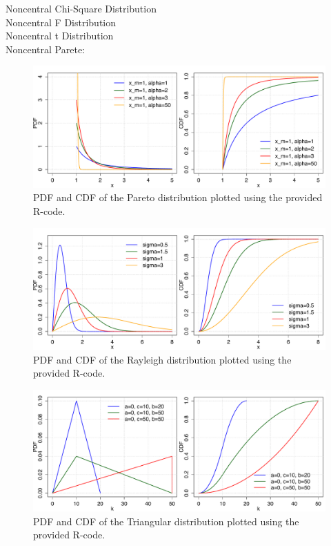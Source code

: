 Noncentral Chi-Square Distribution\\
Noncentral F Distribution\\
Noncentral t Distribution\\
Noncentral Parete:\\

\begin{figure}[htb!]
\centering
  \includegraphics[width=140mm]{pics/Pareto_pdf_cdf.pdf}
 \caption{PDF and CDF of the Pareto distribution plotted using the provided R-code.}
 \label{fig:Pareto_pdf_cdf}
\end{figure}

\begin{figure}[htb!]
\centering
  \includegraphics[width=140mm]{pics/Rayleigh_pdf_cdf.pdf}
 \caption{PDF and CDF of the Rayleigh distribution plotted using the provided R-code.}
 \label{fig:Rayleigh_pdf_cdf}
\end{figure}

\begin{figure}[htb!]
\centering
  \includegraphics[width=140mm]{pics/Triangular_pmf_cdf.pdf}
 \caption{PDF and CDF of the Triangular distribution plotted using the provided R-code.}
 \label{fig:Triangular_pmf_cdf}
\end{figure}



